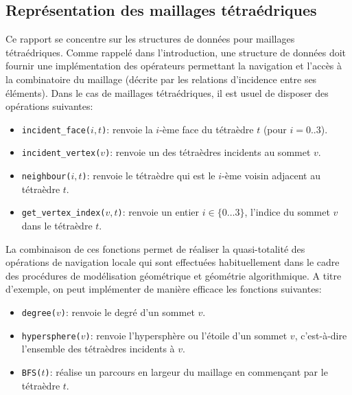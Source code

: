 \subsection{Représentation des maillages tétraédriques}
\label{representation_maillages_tetra}
\noindent
Ce rapport se concentre sur les structures de données pour maillages tétraédriques. Comme rappelé dans l'introduction, une structure de données doit fournir une implémentation des opérateurs permettant la navigation et l'accès à la combinatoire du maillage (décrite par les relations d'incidence entre ses éléments). Dans le cas de maillages tétraédriques, il est usuel de disposer des opérations suivantes:
\begin{itemize}
\item \texttt{incident\_face($i,t$)}: renvoie la $i$-ème face du tétraèdre $t$ (pour $i=0..3$).
\item \texttt{incident\_vertex($v$)}: renvoie un des tétraèdres incidents au sommet $v$.
\item \texttt{neighbour($i, t$)}: renvoie le tétraèdre qui est le $i$-ème voisin adjacent au tétraèdre $t$. 
\item \texttt{get\_vertex\_index($v,t$)}: renvoie un entier $i\in\{0 \ldots 3 \}$, l'indice du sommet $v$ dans le tétraèdre $t$.
\end{itemize}
\noindent
La combinaison de ces fonctions permet de réaliser la quasi-totalité des opérations de navigation locale qui sont effectuées habituellement
dans le cadre des procédures de modélisation géométrique et géométrie algorithmique. A titre d'exemple, on peut implémenter de manière efficace les fonctions suivantes:
\begin{itemize}
\item \texttt{degree($v$)}: renvoie le degré d'un sommet $v$.
\item \texttt{hypersphere($v$)}: renvoie l'hypersphère ou l'étoile d'un sommet $v$, c'est-à-dire l'ensemble des tétraèdres incidents à $v$.
\item \texttt{BFS($t$)}: réalise un parcours en largeur du maillage en commen\c cant par le tétraèdre $t$.
\end{itemize}
